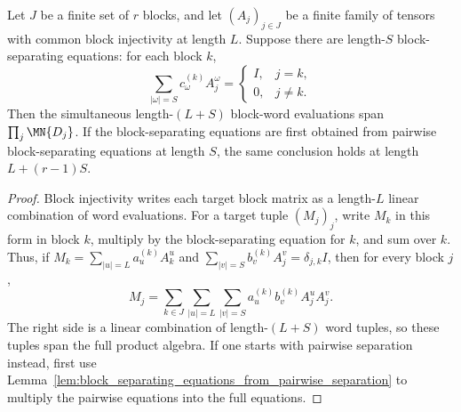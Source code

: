 \begin{lemma}
    \label{lem:product_word_span_from_bnt_block_separation}
    \leanok
    Let $J$ be a finite set of $r$ blocks, and let $(A_j)_{j\in J}$ be a
    finite family of tensors with common block injectivity at length $L$.
    Suppose there are length-$S$ block-separating equations: for each block
    $k$,
    \[
        \sum_{|\omega|=S} c_\omega^{(k)} A_j^\omega
        =
        \begin{cases}
            I, & j=k,    \\
            0, & j\ne k.
        \end{cases}
    \]
    Then the simultaneous length-$(L+S)$ block-word evaluations span
    $\prod_j \MN{D_j}$. If the block-separating equations are first obtained
    from pairwise block-separating equations at length $S$, the same conclusion
    holds at length $L+(r-1)S$.
\end{lemma}

\begin{proof}
    \leanok
    Block injectivity writes each target block matrix as a length-$L$ linear
    combination of word evaluations. For a target tuple $(M_j)_j$, write $M_k$
    in this form in block $k$, multiply by the block-separating equation for
    $k$, and sum over $k$. Thus, if
    $M_k=\sum_{|u|=L}a_u^{(k)}A_k^u$ and
    $\sum_{|v|=S}b_v^{(k)}A_j^v=\delta_{j,k}I$, then for every block $j$,
    \[
        M_j=
        \sum_{k\in J}\sum_{|u|=L}\sum_{|v|=S}
        a_u^{(k)}b_v^{(k)} A_j^u A_j^v .
    \]
    The right side is a linear combination of length-$(L+S)$ word tuples, so
    these tuples span the full product algebra.
    If one starts with pairwise separation instead, first use
    Lemma~\ref{lem:block_separating_equations_from_pairwise_separation} to
    multiply the pairwise equations into the full equations.
\end{proof}
